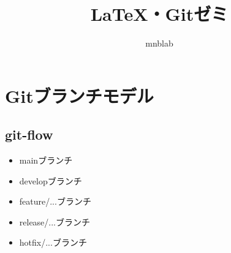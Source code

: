 \documentclass[uplatex, dvipdfmx, a4paper, 12pt]{jsarticle}
\begin{document}
\title{\LaTeX ・Gitゼミ}
\author{mnblab}
\maketitle

\section{Gitブランチモデル}

\subsection{git-flow}

\begin{itemize}
  \item mainブランチ
  \item developブランチ
  \item feature/...ブランチ
  \item release/...ブランチ
  \item hotfix/...ブランチ
\end{itemize}
\end{document}
